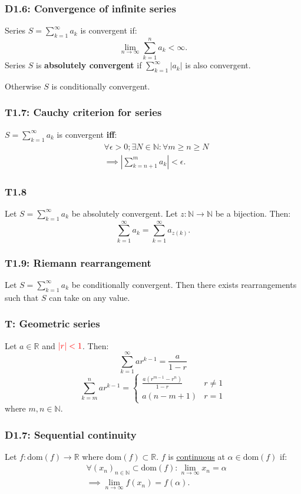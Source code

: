 \documentclass{article}
\begin{document}
\begin{multicols*}{3}
\subsubsection*{D1.6: Convergence of infinite series}
Series $\displaystyle S=\sum_{k=1}^{\infty}a_k$ is
convergent if:
$$\lim_{n\rightarrow\infty}\sum_{k=1}^{n}a_k<\infty.$$
Series $S$ is \textbf{absolutely convergent} if
$\displaystyle\sum_{k=1}^{\infty}|a_k|$ is also convergent.

Otherwise $S$ is conditionally convergent.

\subsubsection*{T1.7: Cauchy criterion for series}
$\displaystyle S=\sum_{k=1}^{\infty}a_k$ is convergent \textbf{if{}f}:
\begin{align*}
    &\forall\epsilon>0; \exists N\in\mathbb{N}:
    \forall m\geq n\geq N \\
    &\implies \left|\sum_{k=n+1}^{m}a_k\right|<\epsilon.
\end{align*}

\subsubsection*{T1.8}
Let $\displaystyle S=\sum_{k=1}^{\infty}a_k$
be absolutely convergent. Let $z:\mathbb{N}
\rightarrow\mathbb{N}$ be a bijection. Then:
$$\sum_{k=1}^{\infty}a_k
=\sum_{k=1}^{\infty}a_{z(k)}.$$

\subsubsection*{T1.9: Riemann rearrangement}
Let $\displaystyle S=\sum_{k=1}^{\infty}a_k$
be conditionally convergent. Then there exists rearrangements
such that $S$ can take on any value.

\subsubsection*{T: Geometric series}
Let $a\in\mathbb{R}$
and $\textcolor{red}{|r|<1}$. Then:
$$\sum_{k=1}^{\infty}ar^{k-1}
=\frac{a}{1-r}$$
$$\sum_{k=m}^{n}ar^{k-1}
=\left\{\begin{array}{ll}
    \frac{a(r^{m-1}-r^n)}{1-r} & r\neq1 \\
    a(n-m+1) & r=1
\end{array}\right.$$
where $m,n\in\mathbb{N}$.

\subsubsection*{D1.7: Sequential continuity}
Let $f:\text{dom}(f)\rightarrow\mathbb{R}$
where $\text{dom}(f)\subset\mathbb{R}$.
$f$ is \underline{continuous} at $\alpha\in\text{dom}(f)$ if:
\begin{align*}
    &\forall(x_n)_{n\in\mathbb{N}}\subset\text{dom}(f):
    \lim_{n\rightarrow\infty}x_n=\alpha \\
    &\implies\lim_{n\rightarrow\infty}f(x_n)=f(\alpha).
\end{align*}


\end{multicols*}
\end{document}
